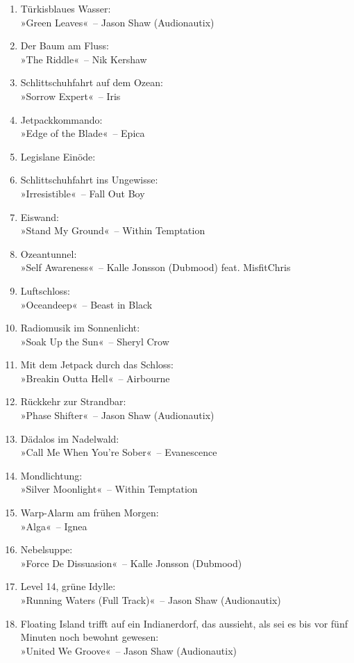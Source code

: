 \begin{enumerate}
    \item Türkisblaues Wasser:\\ »Green Leaves«~– Jason Shaw (Audionautix)
    \item Der Baum am Fluss:\\ »The Riddle«~– Nik Kershaw
    \item Schlittschuhfahrt auf dem Ozean:\\ »Sorrow Expert«~– Iris %
    \item Jetpackkommando:\\ »Edge of the Blade«~– Epica
    \item Legislane Einöde:\\
    \item Schlittschuhfahrt ins Ungewisse:\\ »Irresistible«~– Fall Out Boy %
    \item Eiswand:\\ »Stand My Ground«~– Within Temptation
    \item Ozeantunnel:\\ »Self Awareness«~– Kalle Jonsson (Dubmood) feat. MisfitChris
    \item Luftschloss:\\ »Oceandeep«~– Beast in Black
    \item Radiomusik im Sonnenlicht:\\ »Soak Up the Sun«~– Sheryl Crow
    \item Mit dem Jetpack durch das Schloss:\\ »Breakin Outta Hell«~– Airbourne
    \item Rückkehr zur Strandbar:\\ »Phase Shifter«~– Jason Shaw (Audionautix)
    \item Dädalos im Nadelwald:\\ »Call Me When You're Sober«~– Evanescence
    \item Mondlichtung:\\ »Silver Moonlight«~– Within Temptation
    \item Warp-Alarm am frühen Morgen:\\ »Alga«~– Ignea
    \item Nebelsuppe:\\ »Force De Dissuasion«~– Kalle Jonsson (Dubmood)
    \item Level 14, grüne Idylle:\\ »Running Waters (Full Track)«~– Jason Shaw (Audionautix)
    \item Floating Island trifft auf ein Indianerdorf, das aussieht, als sei es bis vor fünf Minuten noch bewohnt gewesen:\\ »United We Groove«~– Jason Shaw (Audionautix)

\end{enumerate}
